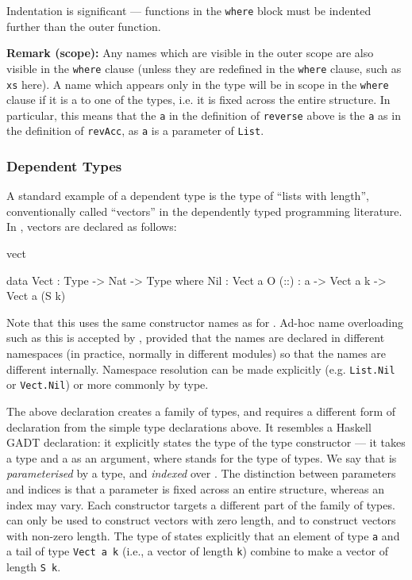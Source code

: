\noindent
Indentation is significant --- functions in the \texttt{where} block must be indented
further than the outer function.

\textbf{Remark (scope):} 
Any names which are visible in the outer scope are also visible in the
\texttt{where} clause (unless they are redefined in the \texttt{where} clause,
such as \texttt{xs} here). A name which appears only in the type will be in
scope in the \texttt{where} clause if it is a  to one of the
types, i.e. it is fixed across the entire structure.  In particular, this means
that the \texttt{a} in the definition of \texttt{reverse} above is the
 \texttt{a} as in the definition of \texttt{revAcc}, as \texttt{a}
is a parameter of \texttt{List}.

\subsubsection{Dependent Types}

A standard example of a dependent type is the type of ``lists with length'',
conventionally called ``vectors'' in the dependently typed programming
literature. In \Idris{}, vectors are declared as follows:

\begin{SaveVerbatim}{vect}

data Vect : Type -> Nat -> Type where
   Nil  : Vect a O
   (::) : a -> Vect a k -> Vect a (S k)

\end{SaveVerbatim}

\noindent
Note that this uses the same constructor names as for . Ad-hoc name
overloading such as this is accepted by \Idris{}, provided that the names are
declared in different namespaces (in practice, normally in different modules)
so that the names are different internally. Namespace resolution can be made
explicitly (e.g. \texttt{List.Nil} or \texttt{Vect.Nil}) or more commonly
by type.

The above declaration creates a family of types, and requires a different form
of declaration from the simple type declarations above. It resembles a Haskell
GADT declaration: it explicitly states the type
of the type constructor  --- it takes a type and a  as an
argument, where  stands for the type of types. We say that 
is \emph{parameterised} by a type, and \emph{indexed} over . 
The distinction between parameters and indices is that a parameter is fixed
across an entire structure, whereas an index may vary.
Each constructor targets a different part of the family of types.  can
only be used to construct vectors with zero length, and \tDC{::} to construct
vectors with non-zero length. The type of \tDC{::} states explicitly that an element
of type \texttt{a} and a tail of type \texttt{Vect a k} (i.e., a vector of length \texttt{k})
combine to make a vector of length \texttt{S k}.

